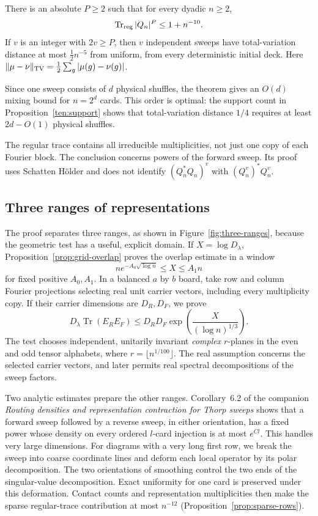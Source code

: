 \begin{theorem}\label{ten:lowplanes:main}
There is an absolute $P\ge2$ such that for every dyadic $n\ge2$,
\begin{equation}\label{ten:lowplanes:eq:1}
 \operatorname{Tr}_{\rm reg}|Q_n|^P\le1+n^{-10}.
\end{equation}
If $v$ is an integer with $2v\ge P$, then $v$ independent sweeps have total-variation distance at most $\frac12n^{-5}$ from uniform, from every deterministic initial deck. Here $\|\mu-\nu\|_{\rm TV}=\tfrac12\sum_g|\mu(g)-\nu(g)|$.
\end{theorem}
Since one sweep consists of $d$ physical shuffles, the theorem gives an $O(d)$ mixing bound for $n=2^d$ cards. This order is optimal: the support count in Proposition~\ref{ten:support} shows that total-variation distance $1/4$ requires at least $2d-O(1)$ physical shuffles.

The regular trace contains all irreducible multiplicities, not just one copy of each Fourier block. The conclusion concerns powers of the forward sweep. Its proof uses Schatten H\"older and does not identify $(Q_n^*Q_n)^v$ with $(Q_n^v)^*Q_n^v$.

\subsection{Three ranges of representations}
The proof separates three ranges, as shown in Figure~\ref{fig:three-ranges}, because the geometric test has a useful, explicit domain. If $X=\log D_\lambda$, Proposition~\ref{prop:grid-overlap} proves the overlap estimate in a window
\[
 ne^{-A_0\sqrt{\log n}}\le X\le A_1n
\]
for fixed positive $A_0,A_1$. In a balanced $a$ by $b$ board, take row and column Fourier projections selecting real unit carrier vectors, including every multiplicity copy. If their carrier dimensions are $D_R,D_F$, we prove
\[
 D_\lambda\operatorname{Tr}(E_RE_F)
 \le D_RD_F\exp\!\left(\frac{X}{(\log n)^{1/3}}\right).
\]
The test chooses independent, unitarily invariant \emph{complex} $r$-planes in the even and odd tensor alphabets, where $r=\lfloor n^{1/100}\rfloor$. The real assumption concerns the selected carrier vectors, and later permits real spectral decompositions of the sweep factors.

Two analytic estimates prepare the other ranges. Corollary~6.2 of the companion \emph{Routing densities and representation contraction for Thorp sweeps} \cite{OpenAI2026Routing} shows that a forward sweep followed by a reverse sweep, in either orientation, has a fixed power whose density on every ordered $l$-card injection is at most $e^{Cl}$. This handles very large dimensions. For diagrams with a very long first row, we break the sweep into coarse coordinate lines and deform each local operator by its polar decomposition. The two orientations of smoothing control the two ends of the singular-value decomposition. Exact uniformity for one card is preserved under this deformation. Contact counts and representation multiplicities then make the sparse regular-trace contribution at most $n^{-12}$ (Proposition~\ref{prop:sparse-rows}).


